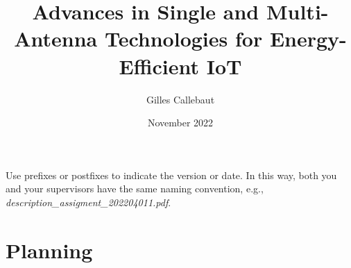 \documentclass{article}
\title{Advances in Single and Multi-Antenna Technologies for Energy-Efficient IoT}
\author{Gilles Callebaut}
\date{November 2022}
\begin{document}
\maketitle

\section*{}

Use prefixes or postfixes to indicate the version or date. In this way, both you and your supervisors have the same naming convention, e.g., \textit{description\_assigment\_202204011.pdf}.

\lipsum[1-1]

\section*{}
\lipsum[3-3]

\section*{Planning}
\lipsum[4-4]
\end{document}
